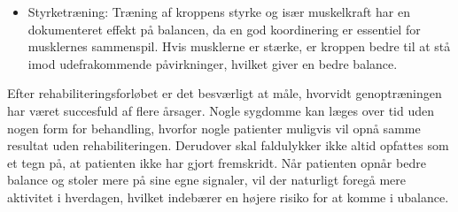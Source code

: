 \begin{itemize}
\item Styrketræning: Træning af kroppens styrke og især muskelkraft har en dokumenteret effekt på balancen, da en god koordinering er essentiel for musklernes sammenspil. Hvis musklerne er stærke, er kroppen bedre til at stå imod udefrakommende påvirkninger, hvilket giver en bedre balance. \cite{Joergensen2004}
\end{itemize}

\noindent Efter rehabiliteringsforløbet er det besværligt at måle, hvorvidt genoptræningen har været succesfuld af flere årsager. Nogle sygdomme kan læges over tid uden nogen form for behandling, hvorfor nogle patienter muligvis vil opnå samme resultat uden rehabiliteringen. Derudover skal faldulykker ikke altid opfattes som et tegn på, at patienten ikke har gjort fremskridt. Når patienten opnår bedre balance og stoler mere på sine egne signaler, vil der naturligt foregå mere aktivitet i hverdagen, hvilket indebærer en højere risiko for at komme i ubalance. \cite{Hain2008} \\
